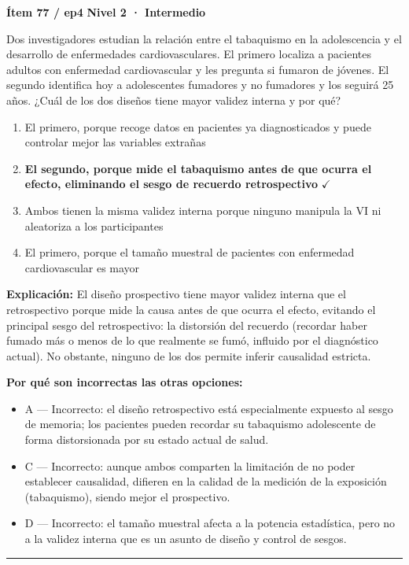 \documentclass[12pt,a4paper]{article}
\begin{document}
\begin{mdframed}[backgroundcolor=fondogris,linecolor=ambar,linewidth=1pt,innerleftmargin=10pt,innerrightmargin=10pt,innertopmargin=7pt,innerbottommargin=7pt]
\textbf{Ítem 77 / ep4} \hfill {\small\bfseries\color{ambar} Nivel 2 · Intermedio}
\end{mdframed}

Dos investigadores estudian la relación entre el tabaquismo en la adolescencia y el desarrollo de enfermedades cardiovasculares. El primero localiza a pacientes adultos con enfermedad cardiovascular y les pregunta si fumaron de jóvenes. El segundo identifica hoy a adolescentes fumadores y no fumadores y los seguirá 25 años. ¿Cuál de los dos diseños tiene mayor validez interna y por qué?

\begin{enumerate}
  \item[A.] El primero, porque recoge datos en pacientes ya diagnosticados y puede controlar mejor las variables extrañas
  \item[\textbf{\color{verde}B.}] \textbf{\color{verde} El segundo, porque mide el tabaquismo antes de que ocurra el efecto, eliminando el sesgo de recuerdo retrospectivo} \hfill $\checkmark$
  \item[C.] Ambos tienen la misma validez interna porque ninguno manipula la VI ni aleatoriza a los participantes
  \item[D.] El primero, porque el tamaño muestral de pacientes con enfermedad cardiovascular es mayor
\end{enumerate}

\noindent\textbf{\color{azul}Explicación:} El diseño prospectivo tiene mayor validez interna que el retrospectivo porque mide la causa antes de que ocurra el efecto, evitando el principal sesgo del retrospectivo: la distorsión del recuerdo (recordar haber fumado más o menos de lo que realmente se fumó, influido por el diagnóstico actual). No obstante, ninguno de los dos permite inferir causalidad estricta.

\noindent\textbf{\color{gris}Por qué son incorrectas las otras opciones:}
\begin{itemize}
  \item {\small A — Incorrecto: el diseño retrospectivo está especialmente expuesto al sesgo de memoria; los pacientes pueden recordar su tabaquismo adolescente de forma distorsionada por su estado actual de salud.}
  \item {\small C — Incorrecto: aunque ambos comparten la limitación de no poder establecer causalidad, difieren en la calidad de la medición de la exposición (tabaquismo), siendo mejor el prospectivo.}
  \item {\small D — Incorrecto: el tamaño muestral afecta a la potencia estadística, pero no a la validez interna que es un asunto de diseño y control de sesgos.}
\end{itemize}
\vspace{8pt}\hrule\vspace{10pt}
\end{document}
